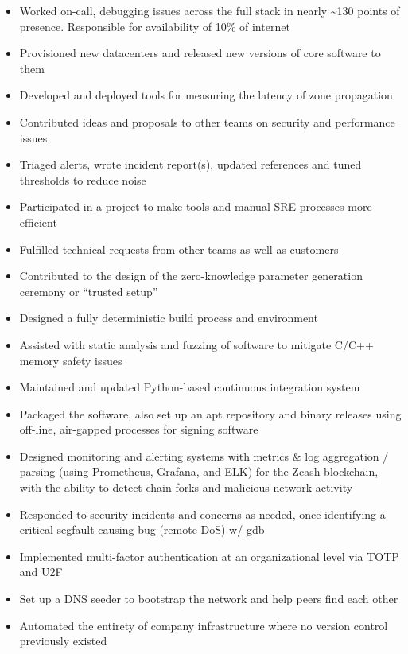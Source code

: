 \documentclass[10pt,a4paper,normalphoto]{altacv}
\begin{document}
\divider

\begin{itemize}
\item Worked on-call, debugging issues across the full stack in nearly \textasciitilde130 points of presence. Responsible for availability of 10\% of internet
\item Provisioned new datacenters and released new versions of core software to them
\item Developed and deployed tools for measuring the latency of zone propagation
\item Contributed ideas and proposals to other teams on security and performance issues
\item Triaged alerts, wrote incident report(s), updated references and tuned thresholds to reduce noise
\item Participated in a project to make tools and manual SRE processes more efficient
\item Fulfilled technical requests from other teams as well as customers
\end{itemize}

\divider

\begin{itemize}
\item Contributed to the design of the zero-knowledge parameter generation ceremony or “trusted setup”
\item Designed a fully deterministic build process and environment
\item Assisted with static analysis and fuzzing of software to mitigate C/C++ memory safety issues
\item Maintained and updated Python-based continuous integration system
\item Packaged the software, also set up an apt repository and binary releases using off-line, air-gapped processes for signing software
\item Designed monitoring and alerting systems with metrics \& log aggregation / parsing (using Prometheus, Grafana, and ELK) for the Zcash blockchain, with the ability to detect chain forks and malicious network activity
\item Responded to security incidents and concerns as needed, once identifying a critical segfault-causing bug (remote DoS) w/ gdb
\item Implemented multi-factor authentication at an organizational level via TOTP and U2F
\item Set up a DNS seeder to bootstrap the network and help peers find each other
\item Automated the entirety of company infrastructure where no version control previously existed
\end{itemize}
\end{document}
